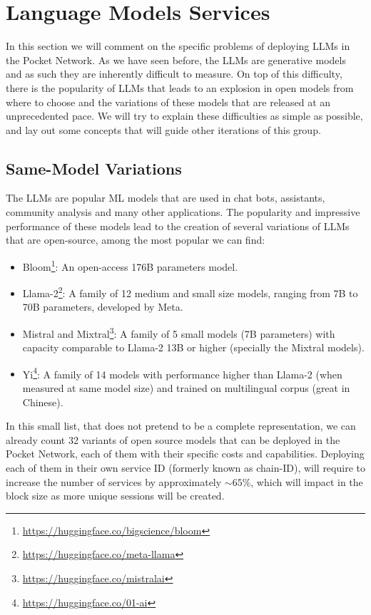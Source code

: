 \section{Language Models Services}\label{sec:d}
In this section we will comment on the specific problems of deploying \glspl{LLM} in the Pocket Network. As we have seen before, the \glspl{LLM} are generative models and as such they are inherently difficult to measure. On top of this difficulty, there is the popularity of \glspl{LLM} that leads to an explosion in open models from where to choose and the variations of these models that are released at an unprecedented pace. We will try to explain these difficulties as simple as possible, and lay out some concepts that will guide other iterations of this group.

\subsection{Same-Model Variations}
The \glspl{LLM} are popular \gls{ML} models that are used in chat bots, assistants, community analysis and many other applications. The popularity and impressive performance of these models lead to the creation of several variations of \glspl{LLM} that are open-source, among the most popular we can find:
\begin{itemize}
    \item Bloom\footnote{\url{https://huggingface.co/bigscience/bloom}}: An open-access 176B parameters model.
    \item Llama-2\footnote{\url{https://huggingface.co/meta-llama}}: A family of 12 medium and small size models, ranging from 7B to 70B parameters, developed by Meta.
    \item Mistral and Mixtral\footnote{\url{https://huggingface.co/mistralai}}: A family of 5 small models (7B parameters) with capacity comparable to Llama-2 13B or higher (specially the Mixtral models).
    \item Yi\footnote{\url{https://huggingface.co/01-ai}}: A family of 14 models with performance higher than Llama-2 (when measured at same model size) and trained on multilingual corpus (great in Chinese).
\end{itemize}
In this small list, that does not pretend to be a complete representation, we can already count 32 variants of open source models that can be deployed in the Pocket Network, each of them with their specific costs and capabilities. Deploying each of them in their own service ID (formerly known as chain-ID), will require to increase the number of services by approximately $\sim65\%$, which will impact in the block size as more unique sessions will be created. 

